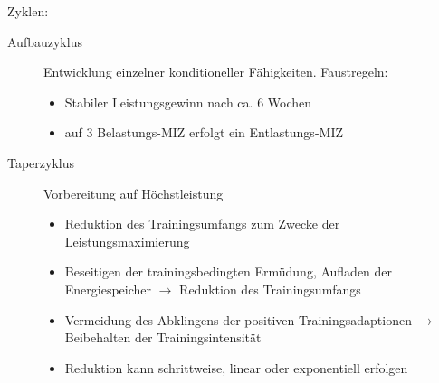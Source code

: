 Zyklen:
\begin{description}
    \item[Aufbauzyklus] Entwicklung einzelner konditioneller Fähigkeiten. Faustregeln:
    \begin{itemize}
        \item Stabiler Leistungsgewinn nach  ca. 6 Wochen
        \item auf 3 Belastungs-MIZ erfolgt ein Entlastungs-MIZ
    \end{itemize}
    \item [Taperzyklus] Vorbereitung auf Höchstleistung
    \begin{itemize}
        \item Reduktion des Trainingsumfangs zum Zwecke der Leistungsmaximierung
        \item Beseitigen der trainingsbedingten Ermüdung, Aufladen der Energiespeicher $\rightarrow$ Reduktion des Trainingsumfangs
        \item Vermeidung des Abklingens der positiven Trainingsadaptionen $\rightarrow$ Beibehalten der Trainingsintensität
        \item Reduktion kann schrittweise, linear oder exponentiell erfolgen
    \end{itemize}
\end{description}

